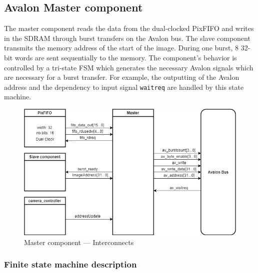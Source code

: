 \documentclass{article}
\begin{document}
\subsection{Avalon Master component}

The master component reads the data from the dual-clocked PixFIFO and writes in the SDRAM through burst transfers on the Avalon bus. The slave component transmits the memory address of the start of the image. During one burst, 8 32-bit words are sent sequentially to the memory. The component's behavior is controlled by a tri-state FSM which generates the necessary Avalon signals which are necessary for a burst transfer. For example, the outputting of the Avalon address and the dependency to input signal \verb'waitreq' are handled by this state machine. 

\begin{figure}[H]
\centering
\includegraphics[scale=0.6]{images/MasterGeneral.png}
\caption{Master component --- Interconnects}
\label{fig:MasterGeneral}
\end{figure}

\subsubsection{Finite state machine description}
\end{document}

